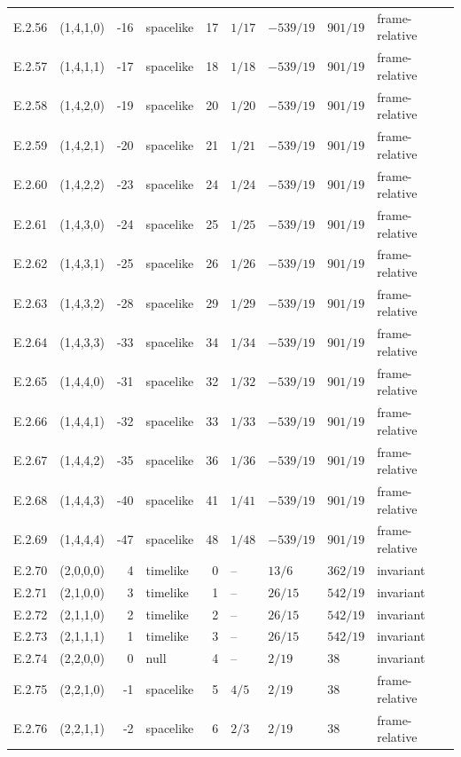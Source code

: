 {\begin{longtable}{@{}llrlrllll@{}}
E.2.56 & (1,4,1,0) & -16 & spacelike & 17 & $1/17$ & $-539/19$ & $901/19$ & frame-relative \\
E.2.57 & (1,4,1,1) & -17 & spacelike & 18 & $1/18$ & $-539/19$ & $901/19$ & frame-relative \\
E.2.58 & (1,4,2,0) & -19 & spacelike & 20 & $1/20$ & $-539/19$ & $901/19$ & frame-relative \\
E.2.59 & (1,4,2,1) & -20 & spacelike & 21 & $1/21$ & $-539/19$ & $901/19$ & frame-relative \\
E.2.60 & (1,4,2,2) & -23 & spacelike & 24 & $1/24$ & $-539/19$ & $901/19$ & frame-relative \\
E.2.61 & (1,4,3,0) & -24 & spacelike & 25 & $1/25$ & $-539/19$ & $901/19$ & frame-relative \\
E.2.62 & (1,4,3,1) & -25 & spacelike & 26 & $1/26$ & $-539/19$ & $901/19$ & frame-relative \\
E.2.63 & (1,4,3,2) & -28 & spacelike & 29 & $1/29$ & $-539/19$ & $901/19$ & frame-relative \\
E.2.64 & (1,4,3,3) & -33 & spacelike & 34 & $1/34$ & $-539/19$ & $901/19$ & frame-relative \\
E.2.65 & (1,4,4,0) & -31 & spacelike & 32 & $1/32$ & $-539/19$ & $901/19$ & frame-relative \\
E.2.66 & (1,4,4,1) & -32 & spacelike & 33 & $1/33$ & $-539/19$ & $901/19$ & frame-relative \\
E.2.67 & (1,4,4,2) & -35 & spacelike & 36 & $1/36$ & $-539/19$ & $901/19$ & frame-relative \\
E.2.68 & (1,4,4,3) & -40 & spacelike & 41 & $1/41$ & $-539/19$ & $901/19$ & frame-relative \\
E.2.69 & (1,4,4,4) & -47 & spacelike & 48 & $1/48$ & $-539/19$ & $901/19$ & frame-relative \\
E.2.70 & (2,0,0,0) & 4 & timelike & 0 & -- & $13/6$ & $362/19$ & invariant \\
E.2.71 & (2,1,0,0) & 3 & timelike & 1 & -- & $26/15$ & $542/19$ & invariant \\
E.2.72 & (2,1,1,0) & 2 & timelike & 2 & -- & $26/15$ & $542/19$ & invariant \\
E.2.73 & (2,1,1,1) & 1 & timelike & 3 & -- & $26/15$ & $542/19$ & invariant \\
E.2.74 & (2,2,0,0) & 0 & null & 4 & -- & $2/19$ & $38$ & invariant \\
E.2.75 & (2,2,1,0) & -1 & spacelike & 5 & $4/5$ & $2/19$ & $38$ & frame-relative \\
E.2.76 & (2,2,1,1) & -2 & spacelike & 6 & $2/3$ & $2/19$ & $38$ & frame-relative \\

\end{longtable}}
